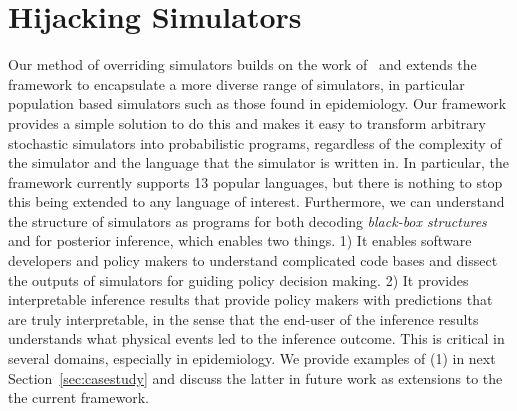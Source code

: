 \documentclass{article}
\begin{document}





\section{Hijacking Simulators}
\label{sec:hijackingsimulators}
 Our method of overriding simulators builds on the work of~\cite{baydin2018efficient} and extends the framework to encapsulate a more diverse range of simulators, in particular population based simulators such as those found in epidemiology.
Our framework provides a simple solution to do this and makes it easy to transform arbitrary stochastic simulators into probabilistic programs, regardless of the complexity of the simulator and the language that the simulator is written in. 
In particular, the framework currently supports 13 popular languages, but there is nothing to stop this being extended to any language of interest. 
Furthermore, we can understand the structure of simulators as programs for both decoding \emph{black-box structures} and for posterior inference, which enables two things. 
1) It enables software developers and policy makers to understand complicated code bases and dissect the outputs of simulators for guiding policy decision making.
 2) It provides interpretable inference results that provide policy makers with predictions that are truly interpretable, in the sense that the end-user of the inference results understands what physical events led to the inference outcome. 
 This is critical in several domains, especially in epidemiology. 
 We provide examples of (1) in next Section~\ref{sec:casestudy} and discuss the latter in future work as extensions to the the current framework.
\end{document}
